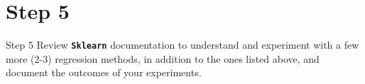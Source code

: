 \section*{Step 5}

\begin{custombox}[label={box:Q5}]{Step 5}
	Review \textbf{\texttt{Sklearn}} documentation to understand and experiment with a few more ($2$-$3$) regression methods, in addition to the ones listed above, and document the outcomes of your experiments.
\end{custombox}

\clearpage
